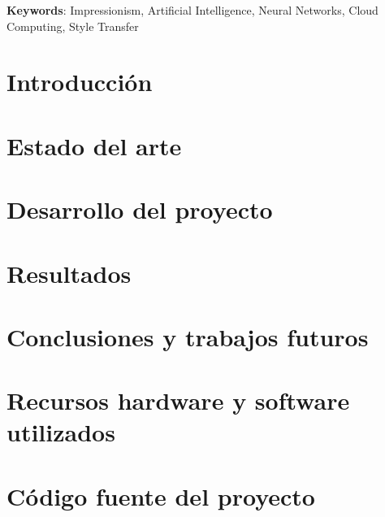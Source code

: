 \documentclass[a4paper]{report}
\newcommand\paginablanco{%
    \null
    \thispagestyle{empty}%
    \newpage}
\begin{document}
\textbf{Keywords}: Impressionism, Artificial Intelligence, Neural Networks, Cloud Computing, Style Transfer

\tableofcontents
\newpage
\listoffigures
\newpage

\paginablanco{}

\chapter{Introducción}

\newpage
\paginablanco{}
\chapter{Estado del arte}

\newpage
\paginablanco{}
\chapter{Desarrollo del proyecto}

\newpage
\chapter{Resultados}

\newpage
\paginablanco{}
\chapter{Conclusiones y trabajos futuros}

\newpage


\appendix
\clearpage
\addappheadtotoc
\appendixpage

\chapter{Recursos hardware y software utilizados}

\chapter{Código fuente del proyecto} %

\end{document}
